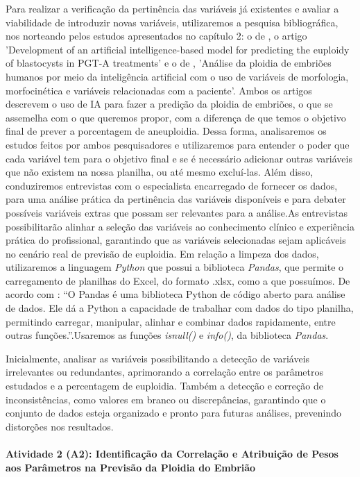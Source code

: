 Para realizar a verificação da pertinência das variáveis já existentes e avaliar a viabilidade de introduzir novas variáveis, utilizaremos a pesquisa bibliográfica, nos norteando pelos estudos apresentados no capítulo 2: o de , o artigo 'Development of an artificial intelligence-based model for predicting the euploidy of blastocysts in PGT-A treatments' e o de , 'Análise da ploidia de embriões humanos por meio da inteligência artificial com o uso de variáveis de morfologia, morfocinética e variáveis relacionadas com a paciente'. Ambos os artigos descrevem o uso de IA para fazer a predição da ploidia de embriões, o que se assemelha com o que queremos propor, com a diferença de que temos o objetivo final de prever a porcentagem de aneuploidia. Dessa forma, analisaremos os estudos feitos por ambos pesquisadores e utilizaremos para entender o poder que cada variável tem para o objetivo final e se é necessário adicionar outras variáveis que não existem na nossa planilha, ou até mesmo excluí-las. Além disso, conduziremos entrevistas com o especialista encarregado de fornecer os dados, para uma análise prática da pertinência das variáveis disponíveis e para debater possíveis variáveis extras que possam ser relevantes para a análise.As entrevistas possibilitarão alinhar a seleção das variáveis ao conhecimento clínico e experiência prática do profissional, garantindo que as variáveis selecionadas sejam aplicáveis no cenário real de previsão de euploidia. Em relação a limpeza dos dados, utilizaremos a linguagem \textit{Python} que possui a biblioteca \textit{Pandas}, que permite o carregamento de planilhas do Excel, do formato .xlsx, como a que possuímos. De acordo com : “O Pandas é uma biblioteca Python de código aberto para análise de dados. Ele dá a Python a capacidade de trabalhar com dados do tipo planilha, permitindo carregar, manipular, alinhar e combinar dados rapidamente, entre outras funções.”.Usaremos as funções \textit{isnull()} e \textit{info()}, da biblioteca \textit{Pandas}.

Inicialmente, analisar as variáveis possibilitando a detecção de variáveis irrelevantes ou redundantes, aprimorando a correlação entre os parâmetros estudados e a percentagem de euploidia. Também a detecção e correção de inconsistências, como valores em branco ou discrepâncias, garantindo que o conjunto de dados esteja organizado e pronto para futuras análises, prevenindo distorções nos resultados. 

\paragraph{\textbf{Atividade 2 (A2):} Identificação da Correlação e Atribuição de Pesos aos Parâmetros na Previsão da Ploidia do Embrião}

